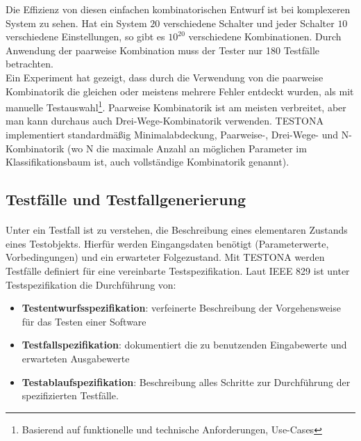 Die Effizienz von diesen einfachen kombinatorischen Entwurf ist bei komplexeren System zu sehen. Hat ein System $20$ verschiedene Schalter und jeder Schalter $10$ verschiedene Einstellungen, so gibt es $10^{20}$ verschiedene Kombinationen. Durch Anwendung der paarweise Kombination muss der Tester nur 180 Testfälle betrachten.\\

Ein Experiment hat gezeigt, dass durch die Verwendung von die paarweise Kombinatorik die gleichen oder meistens mehrere Fehler entdeckt wurden, als mit manuelle Testauswahl\footnote{Basierend auf funktionelle und technische Anforderungen, Use-Cases}. Paarweise Kombinatorik ist am meisten verbreitet, aber man kann durchaus auch Drei-Wege-Kombinatorik verwenden. TESTONA implementiert standardmäßig Minimalabdeckung, Paarweise-, Drei-Wege- und N-Kombinatorik (wo N die maximale Anzahl an möglichen Parameter im Klassifikationsbaum ist, auch vollständige Kombinatorik genannt)\cite{CombinatorialSTesting}.\\




\subsection{Testfälle und Testfallgenerierung}
\paragraph{}



Unter ein Testfall ist zu verstehen, die Beschreibung eines elementaren Zustands eines Testobjekts. Hierfür werden Eingangsdaten benötigt (Parameterwerte, Vorbedingungen) und ein erwarteter Folgezustand. Mit TESTONA werden Testfälle definiert für eine vereinbarte Testspezifikation. Laut IEEE 829 ist unter Testspezifikation die Durchführung von:

\begin{itemize}
\item\textbf{ Testentwurfsspezifikation}: verfeinerte Beschreibung der Vorgehensweise für das Testen einer Software
\item \textbf{Testfallspezifikation}: dokumentiert die zu benutzenden Eingabewerte und erwarteten Ausgabewerte
\item \textbf{Testablaufspezifikation}: Beschreibung alles Schritte zur Durchführung der spezifizierten Testfälle.
\end{itemize}

